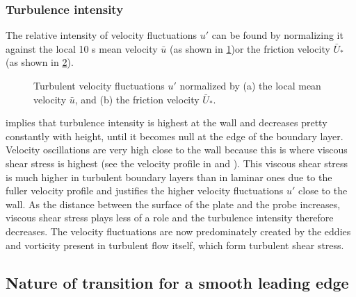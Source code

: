 \documentclass{article}
\begin{document}
\subsubsection{Turbulence intensity}

The relative intensity of velocity fluctuations $u'$ can be found by normalizing it against the local 10 \unit{\second} mean velocity $\bar{u}$ (as shown in \ref{fig:boundary_layer_freestream})or the friction velocity $\bar{U}_*$ (as shown in \ref{fig:boundary_layer_friction}).

\begin{figure}[H]
    \centering
    \begin{subfigure}[b]{0.49\textwidth}
        \centering
        
        \caption{}
        \label{fig:boundary_layer_freestream}
    \end{subfigure}
    \hfill
    \begin{subfigure}[b]{0.49\textwidth}
        \centering
        
        \caption{}
        \label{fig:boundary_layer_friction}
    \end{subfigure}
    \caption{Turbulent velocity fluctuations $u'$ normalized by (a) the local mean velocity $\bar{u}$, and (b) the friction velocity $\bar{U}_*$.}
    \label{fig:turbulence_intensity}
\end{figure}

 implies that turbulence intensity is highest at the wall and decreases pretty constantly with height, until it becomes null at the edge of the boundary layer. Velocity oscillations are very high close to the wall because this is where viscous shear stress is highest (see the velocity profile in  and ). This viscous shear stress is much higher in turbulent boundary layers than in laminar ones due to the fuller velocity profile and justifies the higher velocity fluctuations $u'$ close to the wall. As the distance between the surface of the plate and the probe increases, viscous shear stress plays less of a role and the turbulence intensity therefore decreases. The velocity fluctuations are now predominately created by the eddies and vorticity present in turbulent flow itself, which form turbulent shear stress.

\subsection{Nature of transition for a smooth leading edge}
\end{document}
